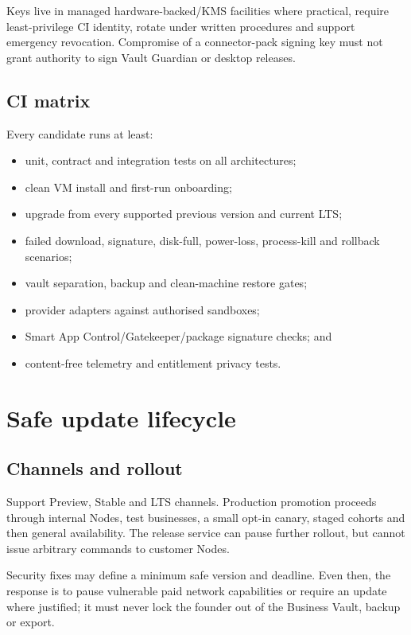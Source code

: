 \documentclass[11pt]{article}
\begin{document}
Keys live in managed hardware-backed/KMS facilities where practical, require least-privilege CI identity, rotate under written procedures and support emergency revocation. Compromise of a connector-pack signing key must not grant authority to sign Vault Guardian or desktop releases.

\subsection{CI matrix}

Every candidate runs at least:

\begin{itemize}
  \item unit, contract and integration tests on all architectures;
  \item clean VM install and first-run onboarding;
  \item upgrade from every supported previous version and current LTS;
  \item failed download, signature, disk-full, power-loss, process-kill and rollback scenarios;
  \item vault separation, backup and clean-machine restore gates;
  \item provider adapters against authorised sandboxes;
  \item Smart App Control/Gatekeeper/package signature checks; and
  \item content-free telemetry and entitlement privacy tests.
\end{itemize}

\section{Safe update lifecycle}

\subsection{Channels and rollout}

Support Preview, Stable and LTS channels. Production promotion proceeds through internal Nodes, test businesses, a small opt-in canary, staged cohorts and then general availability. The release service can pause further rollout, but cannot issue arbitrary commands to customer Nodes.

Security fixes may define a minimum safe version and deadline. Even then, the response is to pause vulnerable paid network capabilities or require an update where justified; it must never lock the founder out of the Business Vault, backup or export.
\end{document}
